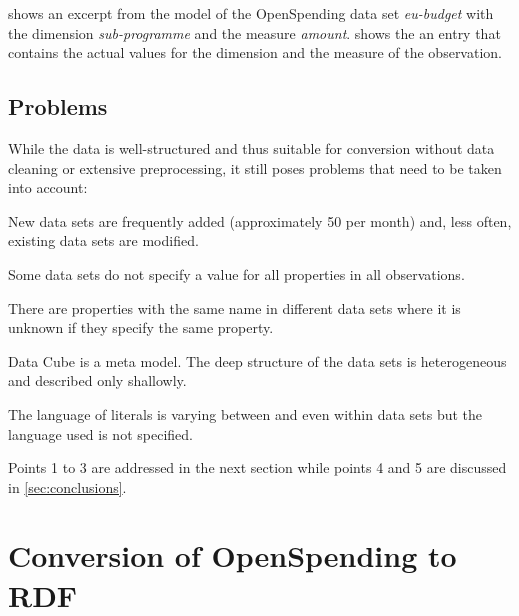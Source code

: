 \documentclass[sw]{iosart2x}
\begin{document}
 shows an excerpt from the model of the OpenSpending data set \emph{eu-budget} with the dimension \emph{sub-programme} and the measure \emph{amount}.
 shows the an entry that contains the actual values for the dimension and the measure of the observation.

\subsection{Problems}
While the data is well-structured and thus suitable for conversion without data cleaning or extensive preprocessing, it still poses problems that need to be taken into account:
\begin{inparaenum}
\item New data sets are frequently added (approximately 50 per month) and, less often, existing data sets are modified.
\item Some data sets do not specify a value for all properties in all observations.
\item There are properties with the same name in different data sets where it is unknown if they specify the same property.
\item Data Cube is a meta model. The deep structure of the data sets is heterogeneous and
 described only shallowly.
\item The language of literals is varying between and even within data sets but the language used is not specified.
\end{inparaenum}
Points 1 to 3 are addressed in the next section while points 4 and 5 are discussed in \cref{sec:conclusions}.


\section{Conversion of OpenSpending to RDF}\label{sec:conversion}

\end{document}
